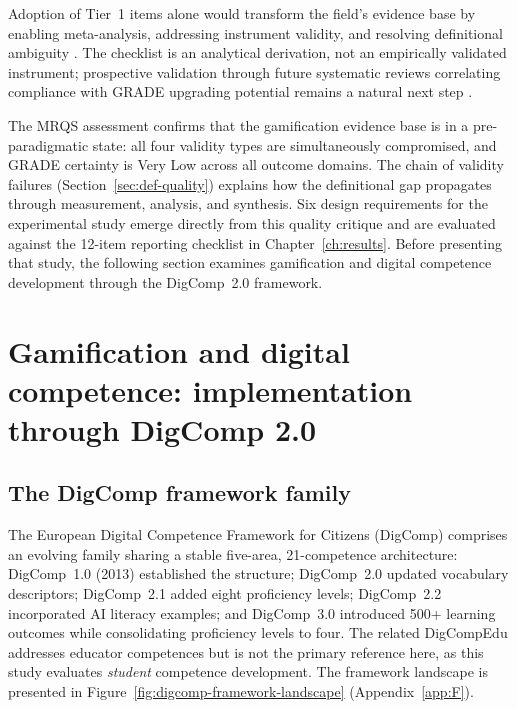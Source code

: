 Adoption of Tier~1 items alone would transform the field's evidence base by enabling meta-analysis, addressing instrument validity, and resolving definitional ambiguity \cite{Glasziou2014}. The checklist is an analytical derivation, not an empirically validated instrument; prospective validation through future systematic reviews correlating compliance with GRADE upgrading potential remains a natural next step \cite{GuyattGRADE2008, Chalmers2009}.

The MRQS assessment confirms that the gamification evidence base is in a pre-paradigmatic state: all four validity types are simultaneously compromised, and GRADE certainty is Very Low across all outcome domains. The chain of validity failures (Section~\ref{sec:def-quality}) explains how the definitional gap propagates through measurement, analysis, and synthesis. Six design requirements for the experimental study emerge directly from this quality critique and are evaluated against the 12-item reporting checklist in Chapter~\ref{ch:results}. Before presenting that study, the following section examines gamification and digital competence development through the DigComp~2.0 framework.


\section{Gamification and digital competence: implementation through DigComp 2.0} \label{sec:digcomp}

\subsection{The DigComp framework family}

The European Digital Competence Framework for Citizens (DigComp) comprises an evolving family sharing a stable five-area, 21-competence architecture: DigComp~1.0 (2013) established the structure; DigComp~2.0 \citep{Vuorikari2016} updated vocabulary descriptors; DigComp~2.1 \citep{Carretero2017} added eight proficiency levels; DigComp~2.2 \citep{Vuorikari2022} incorporated AI literacy examples; and DigComp~3.0 \citep{Cosgrove2025} introduced 500+ learning outcomes while consolidating proficiency levels to four. The related DigCompEdu \citep{Redecker2017} addresses educator competences but is not the primary reference here, as this study evaluates \textit{student} competence development. The framework landscape is presented in Figure~\ref{fig:digcomp-framework-landscape} (Appendix~\ref{app:F}).


